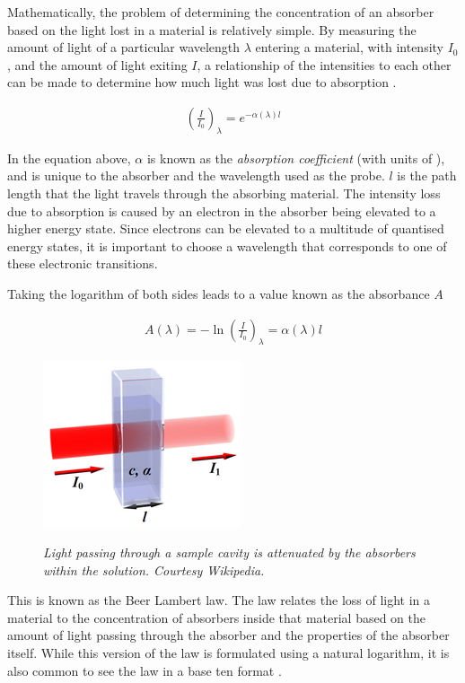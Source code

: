 Mathematically, the problem of determining the concentration of an absorber
based on the light lost in a material is relatively simple. By measuring the
amount of light of a particular wavelength $\lambda$ entering a material, with
intensity $I_0$, and the amount of light exiting $I$, a relationship of the
intensities to each other can be made to determine how much light was lost due
to absorption \cite{Hollas:2004uh}.

\begin{align*}
  \left(\frac{I}{I_0}\right)_\lambda = e^{-\alpha(\lambda)l}
\end{align*}

In the equation above, $\alpha$ is known as the \emph{absorption coefficient}
(with units of \icm), and is unique to the absorber and the wavelength used as
the probe. $l$ is the path length that the light travels through the absorbing
material. The intensity loss due to absorption is caused by an electron in
the absorber being elevated to a higher energy state. Since electrons can be
elevated to a multitude of quantised energy states, it is important to choose
a wavelength that corresponds to one of these electronic transitions.

Taking the logarithm of both sides leads to a value known as the absorbance $A$

\begin{align}
  A(\lambda)=-\ln\left(\frac{I}{I_0}\right)_\lambda = \alpha(\lambda)l\label{eq:beer}
\end{align}


\begin{figure}
\begin{center}
  \includegraphics[width=\marginspace]{figures/beer.png}
\end{center}
\emph{\footnotesize{Light passing through a sample cavity is attenuated by the absorbers within the solution. Courtesy Wikipedia.}}
\label{fig:microtiter}
\end{figure}

This is known as the Beer Lambert law. The law relates the loss of light in a
material to the concentration of absorbers inside that material based on the
amount of light passing through the absorber and the properties of the absorber
itself.  While this version of the  law is formulated using a natural logarithm, it is also common to see the law in a base ten format \cite{Hollas:2004uh}.

